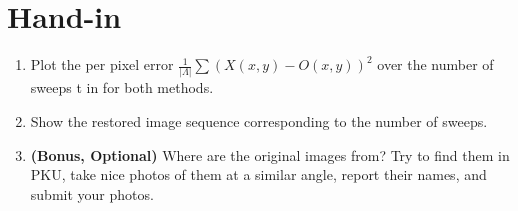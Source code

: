 \documentclass[11pt]{article}
\begin{document}
\section{Hand-in}

\begin{enumerate}
    \item Plot the per pixel error $\frac{1}{|\Lambda|} \sum (X(x,y) -  O(x,y)) ^ 2$ over the number of sweeps t in for both methods. 
    \item Show the restored image sequence corresponding to the number of sweeps.
    \item \textbf{(Bonus, Optional)} Where are the original images from? Try to find them in PKU, take nice photos of them at a similar angle, report their names, and submit your photos. 
\end{enumerate}
\end{document}
